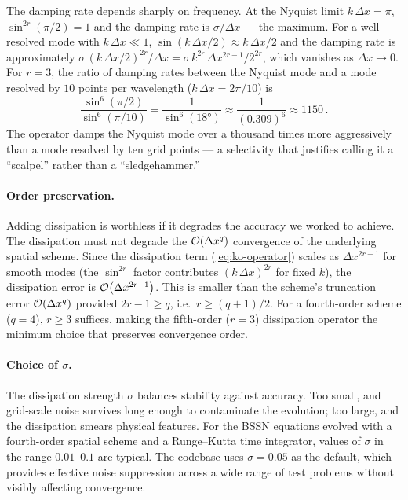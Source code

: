 The damping rate depends sharply on frequency.  At the Nyquist limit
$k\,\Delta x = \pi$, $\sin^{2r}(\pi/2) = 1$ and the damping rate is
$\sigma/\Delta x$ --- the maximum.  For a well-resolved mode with
$k\,\Delta x \ll 1$, $\sin(k\,\Delta x/2) \approx k\,\Delta x/2$ and
the damping rate is approximately
$\sigma\,(k\,\Delta x/2)^{2r}/\Delta x = \sigma\,k^{2r}\,
\Delta x^{2r-1}/2^{2r}$, which vanishes as $\Delta x \to 0$.
For $r = 3$, the ratio of damping rates between the Nyquist mode and a
mode resolved by $10$ points per wavelength ($k\,\Delta x = 2\pi/10$) is
%
\begin{equation}
  \frac{\sin^6(\pi/2)}{\sin^6(\pi/10)}
  = \frac{1}{\sin^6(18°)}
  \approx \frac{1}{(0.309)^6}
  \approx 1150 \,.
  \label{eq:ko-selectivity}
\end{equation}
%
The operator damps the Nyquist mode over a thousand times more
aggressively than a mode resolved by ten grid points --- a selectivity
that justifies calling it a ``scalpel'' rather than a ``sledgehammer.''

\paragraph{Order preservation.}

Adding dissipation is worthless if it degrades the accuracy we worked to
achieve.  The dissipation must not degrade the $\mathcal{O}\!\left(\Delta x^q\right)$
convergence of the underlying spatial scheme.  Since the dissipation term
(\cref{eq:ko-operator}) scales as $\Delta x^{2r-1}$ for smooth modes
(the $\sin^{2r}$ factor contributes $(k\,\Delta x)^{2r}$ for fixed $k$),
the dissipation error is $\mathcal{O}\!\left(\Delta x^{2r-1}\right)$.  This is smaller
than the scheme's truncation error $\mathcal{O}\!\left(\Delta x^q\right)$ provided
$2r - 1 \geq q$, i.e.\ $r \geq (q + 1)/2$.  For a fourth-order scheme ($q = 4$),
$r \geq 3$ suffices, making the fifth-order ($r = 3$) dissipation operator
the minimum choice that preserves convergence order.

\paragraph{Choice of $\sigma$.}

The dissipation strength $\sigma$ balances stability against accuracy.
Too small, and grid-scale noise survives long enough to contaminate the
evolution; too large, and the dissipation smears physical features.  For
the BSSN equations evolved with a fourth-order spatial scheme and a
Runge--Kutta time integrator, values of $\sigma$ in the range
$0.01$--$0.1$ are typical.  The codebase uses $\sigma = 0.05$ as the
default, which provides effective noise suppression across a wide range of
test problems without visibly affecting convergence.

